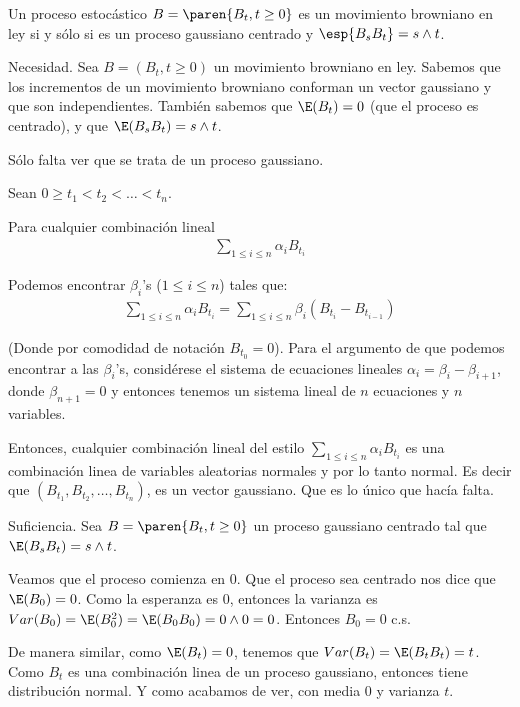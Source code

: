 \begin{problema}
	Un proceso estoc\'astico $B=\paren{B_t,t\geq 0}$ es un movimiento 
	browniano en ley si y s\'olo si es un proceso gaussiano centrado y $\esp{B_sB_t}=s\wedge t$. 
\end{problema}

\afterstatement\pn

Necesidad. Sea $B = (B_t, t \geq 0)$ un movimiento browniano en ley. Sabemos que los incrementos de un
movimiento browniano conforman un vector gaussiano y que son independientes. También sabemos que $\E(B_t) = 0$ (que el proceso es centrado), 
y que $\E(B_s B_t) = s \wedge t$.\pn

Sólo falta ver que se trata de un proceso gaussiano.\pn

Sean $0 \geq t_1 < t_2 < \dots < t_n$.\pn

Para cualquier combinación lineal 
\begin{align}
        \sum_{1 \leq i \leq n}  \alpha_i B_{t_i}
\end{align}\pn

Podemos encontrar $\beta_i$'s ($1 \leq i \leq n$) tales que:
\begin{align}
        \sum_{1 \leq i \leq n}  \alpha_i B_{t_i} = \sum_{1 \leq i \leq n}  \beta_i (B_{t_i} - B_{t_{i-1}}) 
\end{align}\pn

(Donde por comodidad de notación $B_{t_0} = 0$). Para el argumento de que podemos encontrar a las $\beta_i$'s, considérese el sistema
de ecuaciones lineales $\alpha_i = \beta_i - \beta_{i+1}$, donde $\beta_{n+1} = 0$ y entonces tenemos un sistema lineal de $n$ 
ecuaciones y $n$ variables.\pn

Entonces, cualquier combinación lineal del estilo $\sum_{1 \leq i \leq n}  \alpha_i B_{t_i}$ es una combinación linea de
variables aleatorias normales y por lo tanto normal. Es decir que $(B_{t_1}, B_{t_2},\dots ,B_{t_n})$, es un vector gaussiano. Que es lo único
que hacía falta.\pn

Suficiencia. Sea $B =   \paren{B_t,t\geq 0}$ un proceso gaussiano centrado tal que $\E(B_s B_t) = s \wedge t$.\pn

Veamos que el proceso comienza en $0$. Que el proceso sea centrado nos dice que $\E(B_0) = 0$. Como la esperanza es $0$, entonces
la varianza es $Var(B_0) = \E(B_0^2) = \E(B_0 B_0) = 0 \wedge 0 = 0$. Entonces $B_0 = 0$ c.s.\pn


De manera similar, como $\E(B_t) = 0$, tenemos que $Var(B_t) = \E(B_t B_t) = t$. Como $B_t$ es una combinación linea de un proceso gaussiano,
entonces tiene distribución normal. Y como acabamos de ver, con media 0 y varianza $t$.

